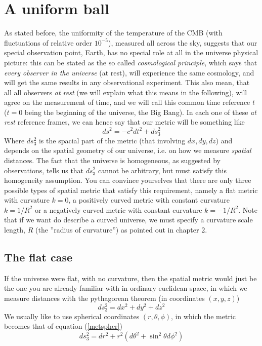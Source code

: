 \section{A uniform ball} 
As stated before, the uniformity of the temperature of the CMB (with fluctuations of relative order $10^{-5}$), measured all across the sky, suggests that our special observation point, Earth, has no special role at all in the universe physical picture: this can be stated as the so called \textit{cosmological principle}, which says that \textit{every observer in the universe} (at rest), will experience the same cosmology, and will get the same results in any observational experiment. This also mean, that all all observers \textit{at rest} (we will explain what this means in the following), will agree on the measurement of time, and we will call this common time reference $t$ ($t=0$ being the beginning of the universe, the Big Bang). In each one of these \textit{at rest} reference frames, we can hence say that our metric will be something like
\begin{equation}
\label{frwsymb}
ds^2=-c^2dt^2+ds_3^2
\end{equation}    
Where $ds_3^2$ is the spacial part of the metric (that involving $dx,dy,dz$) and depends on the spatial geometry of our universe, i.e. on how we measure \textit{spatial} distances. The fact that the universe is homogeneous, as suggested by observations, tells us that $ds_3^2$ cannot be arbitrary, but must satisfy this homogeneity assumption. You can convince yourselves that there are only three possible types of spatial metric that satisfy this requirement, namely a flat metric with curvature $k=0$, a positively curved metric with constant curvature $k=1/R^2$ or a negatively curved metric with constant curvature $k=-1/R^2$. Note that if we want do describe a curved universe, we must specify a curvature scale length, $R$ (the ''radius of curvature'') as pointed out in chapter 2. 
\subsection{The flat case}
If the universe were flat, with no curvature, then the spatial metric would just be the one you are already familiar with in ordinary euclidean space, in which we measure distances with the pythagorean theorem (in coordinates $(x,y,z)$)
\begin{equation}
ds_3^2=dx^2+dy^2+dz^2
\end{equation}
We usually like to use spherical coordinates $(r,\theta,\phi)$, in which the metric becomes that of equation (\ref{metspher})
\begin{equation}
ds_3^2=dr^2+r^2(d\theta^2 + \sin^2{\theta}d\phi^2)
\end{equation}
